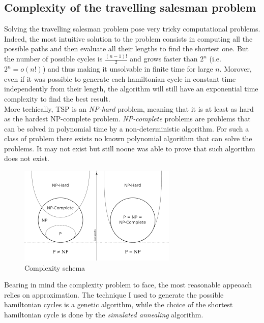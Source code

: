 \documentclass{article}
\begin{document}
\subsection{Complexity of the travelling salesman problem}
Solving the travelling salesman problem pose very tricky computational problems. Indeed, the most intuitive solution to the problem consists in computing all the possible paths and then evaluate all their lengths to find the shortest one. But the number of possible cycles is $\frac{(n-1)!}{2}$ and grows faster than $2^n$ (i.e. $2^n = o(n!)$) and thus making it unsolvable in finite time for large $n$. Morover, even if it was possible to generate each hamiltonian cycle in constant time independently from their length, the algorithm will still have an exponential time complexity to find the best result.  \\
More techically, TSP is an \textit{NP-hard} problem, meaning that it is at least as hard as the hardest NP-complete problem. \textit{NP-complete} problems are problems that can be solved in polynomial time by a non-deterministic algorithm. For such a class of problem there exists no known polynomial algorithm that can solve the problems. It may not exist but still noone was able to prove that such algorithm does not exist.
\begin{figure}[H]
\includegraphics[scale=0.25]{complexity_classes.png} 
\centering
\caption{Complexity schema}
\end{figure}
\noindent Bearing in mind the complexity problem to face, the most reasonable appeoach relies on approximation. The technique I used to generate the possible hamiltonian cycles is a genetic algorithm, while the choice of the shortest hamiltonian cycle is done by the \textit{simulated annealing} algorithm.
\end{document}
